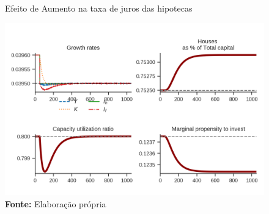 \begin{figure}[htb]
	\centering
	\caption{Efeito de Aumento na taxa de juros das hipotecas}
	\label{choque_3}
	\includegraphics{../../Modelo/Versoes/Shock_3.png}
	\caption*{\textbf{Fonte:} Elaboração própria}
\end{figure}



